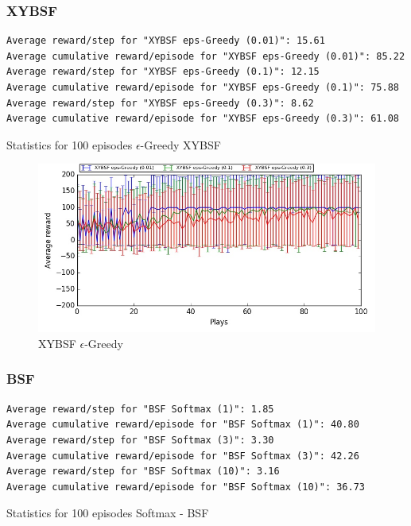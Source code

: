 \documentclass[11pt, a4paper]{article}
\begin{document}
\subsubsection*{XYBSF}
\begin{listing}
\begin{verbatim}
Average reward/step for "XYBSF eps-Greedy (0.01)": 15.61
Average cumulative reward/episode for "XYBSF eps-Greedy (0.01)": 85.22
Average reward/step for "XYBSF eps-Greedy (0.1)": 12.15
Average cumulative reward/episode for "XYBSF eps-Greedy (0.1)": 75.88
Average reward/step for "XYBSF eps-Greedy (0.3)": 8.62
Average cumulative reward/episode for "XYBSF eps-Greedy (0.3)": 61.08
\end{verbatim}
\caption{Statistics for 100 episodes $\epsilon$-Greedy XYBSF}
\end{listing}

\begin{figure}[H]
\centering
\includegraphics[width=14cm]{XYBSF_eps_Learning}
\caption{XYBSF $\epsilon$-Greedy}
\end{figure}
\subsubsection*{BSF}
\begin{listing}
\begin{verbatim}
Average reward/step for "BSF Softmax (1)": 1.85
Average cumulative reward/episode for "BSF Softmax (1)": 40.80
Average reward/step for "BSF Softmax (3)": 3.30
Average cumulative reward/episode for "BSF Softmax (3)": 42.26
Average reward/step for "BSF Softmax (10)": 3.16
Average cumulative reward/episode for "BSF Softmax (10)": 36.73
\end{verbatim}
\caption{Statistics for 100 episodes Softmax - BSF}
\end{listing}
\end{document}
